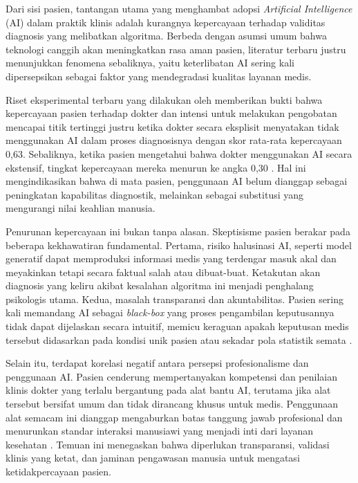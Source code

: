 Dari sisi pasien, tantangan utama yang menghambat adopsi \textit{Artificial Intelligence} (AI) dalam praktik klinis adalah kurangnya kepercayaan terhadap validitas diagnosis yang melibatkan algoritma. Berbeda dengan asumsi umum bahwa teknologi canggih akan meningkatkan rasa aman pasien, literatur terbaru justru menunjukkan fenomena sebaliknya, yaitu keterlibatan AI sering kali dipersepsikan sebagai faktor yang mendegradasi kualitas layanan medis.

Riset eksperimental terbaru yang dilakukan oleh \textcite{chen2025impact} memberikan bukti bahwa kepercayaan pasien terhadap dokter dan intensi untuk melakukan pengobatan mencapai titik tertinggi justru ketika dokter secara eksplisit menyatakan tidak menggunakan AI dalam proses diagnosisnya dengan skor rata-rata kepercayaan 0,63. Sebaliknya, ketika pasien mengetahui bahwa dokter menggunakan AI secara ekstensif, tingkat kepercayaan mereka menurun ke angka 0,30 \autocite{chen2025impact}. Hal ini mengindikasikan bahwa di mata pasien, penggunaan AI belum dianggap sebagai peningkatan kapabilitas diagnostik, melainkan sebagai substitusi yang mengurangi nilai keahlian manusia.

Penurunan kepercayaan ini bukan tanpa alasan. Skeptisisme pasien berakar pada beberapa kekhawatiran fundamental. Pertama, risiko halusinasi AI, seperti model generatif dapat memproduksi informasi medis yang terdengar masuk akal dan meyakinkan tetapi secara faktual salah atau dibuat-buat. Ketakutan akan diagnosis yang keliru akibat kesalahan algoritma ini menjadi penghalang psikologis utama. Kedua, masalah transparansi dan akuntabilitas. Pasien sering kali memandang AI sebagai \textit{black-box} yang proses pengambilan keputusannya tidak dapat dijelaskan secara intuitif, memicu keraguan apakah keputusan medis tersebut didasarkan pada kondisi unik pasien atau sekadar pola statistik semata \autocite{chen2025impact}.

Selain itu, terdapat korelasi negatif antara persepsi profesionalisme dan penggunaan AI. Pasien cenderung mempertanyakan kompetensi dan penilaian klinis dokter yang terlalu bergantung pada alat bantu AI, terutama jika alat tersebut bersifat umum dan tidak dirancang khusus untuk medis. Penggunaan alat semacam ini dianggap mengaburkan batas tanggung jawab profesional dan menurunkan standar interaksi manusiawi yang menjadi inti dari layanan kesehatan \autocite{chen2025impact}. Temuan ini menegaskan bahwa diperlukan transparansi, validasi klinis yang ketat, dan jaminan pengawasan manusia untuk mengatasi ketidakpercayaan pasien.

